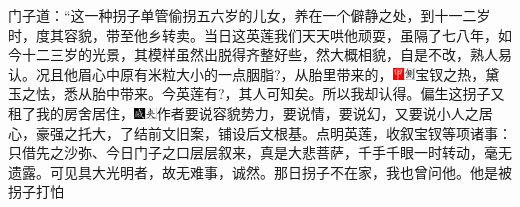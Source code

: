 门子道：``这一种拐子单管偷拐五六岁的儿女，养在一个僻静之处，到十一二岁时，度其容貌，带至他乡转卖。当日这英莲我们天天哄他顽耍，虽隔了七八年，如今十二三岁的光景，其模样虽然出脱得齐整好些，然大概相貌，自是不改，熟人易认。况且他眉心中原有米粒大小的一点胭脂?，从胎里带来的，{{{\includegraphics[width=3mm]{../Images/00002}\includegraphics[width=3mm]{../Images/00011}\footnotesize \kaishu 宝钗之热，黛玉之怯，悉从胎中带来。今英莲有}?{，其人可知矣。}}}所以我却认得。偏生这拐子又租了我的房舍居住，{\includegraphics[width=3mm]{../Images/00005}\includegraphics[width=3mm]{../Images/00012}\footnotesize \kaishu 作者要说容貌势力，要说情，要说幻，又要说小人之居心，豪强之托大，了结前文旧案，铺设后文根基。点明英莲，收叙宝钗等项诸事：只借先之沙弥、今日门子之口层层叙来，真是大悲菩萨，千手千眼一时转动，毫无遗露。可见具大光明者，故无难事，诚然。}那日拐子不在家，我也曾问他。他是被拐子打怕
